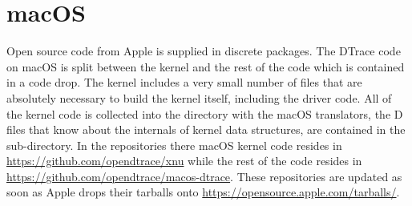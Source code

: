 \section{macOS}
\label{sec:macos-code}

Open source code from Apple is supplied in discrete packages.  The
DTrace code on macOS is split between the  kernel and
the rest of the code which is contained in a  code
drop.  The kernel includes a very small number of files that are
absolutely necessary to build the kernel itself, including the driver
code.  All of the kernel code is collected into the
 directory with the macOS translators,
the D files that know about the internals of kernel data structures,
are contained in the  sub-directory.  In the
 repositories there macOS kernel code resides in
\url{https://github.com/opendtrace/xnu} while the rest of the code
resides in \url{https://github.com/opendtrace/macos-dtrace}.  These
repositories are updated as soon as Apple drops their tarballs onto
\url{https://opensource.apple.com/tarballs/}.

